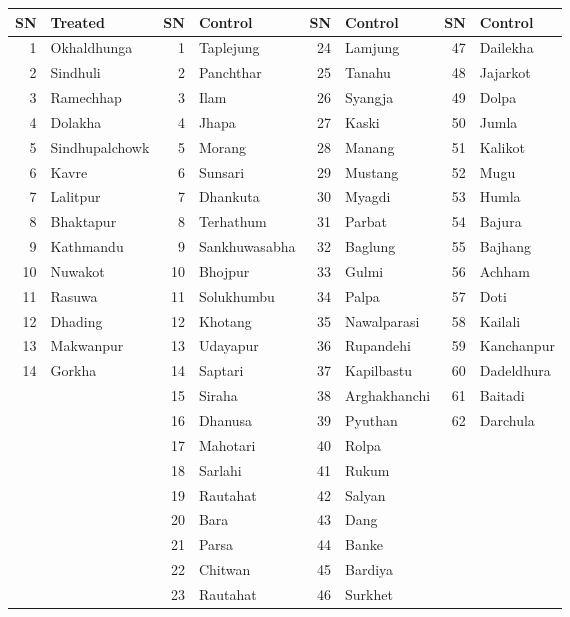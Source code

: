 


\begin{tabular}{r| l | r| l | r| l | r| l}
\hline\hline
SN& Treated & SN & Control  & SN & Control & SN & Control  \\
\hline
1  & Okhaldhunga     & 1  & Taplejung      & 24 & Lamjung         & 47 & Dailekha \\
2  & Sindhuli        & 2  & Panchthar      & 25 & Tanahu          & 48 & Jajarkot \\
3  & Ramechhap       & 3  & Ilam           & 26 & Syangja         & 49 & Dolpa \\
4  & Dolakha         & 4  & Jhapa          & 27 & Kaski           & 50 & Jumla \\
5  & Sindhupalchowk  & 5  & Morang         & 28 & Manang          & 51 & Kalikot \\
6  & Kavre           & 6  & Sunsari        & 29 & Mustang         & 52 & Mugu \\
7  & Lalitpur        & 7  & Dhankuta       & 30 & Myagdi          & 53 & Humla \\
8  & Bhaktapur       & 8  & Terhathum      & 31 & Parbat          & 54 & Bajura \\
9  & Kathmandu       & 9  & Sankhuwasabha  & 32 & Baglung         & 55 & Bajhang \\
10 & Nuwakot         & 10 & Bhojpur        & 33 & Gulmi           & 56 & Achham \\
11 & Rasuwa          & 11 & Solukhumbu     & 34 & Palpa           & 57 & Doti \\
12 & Dhading         & 12 & Khotang        & 35 & Nawalparasi     & 58 & Kailali \\
13 & Makwanpur       & 13 & Udayapur       & 36 & Rupandehi       & 59 & Kanchanpur \\
14 & Gorkha          & 14 & Saptari        & 37 & Kapilbastu      & 60 & Dadeldhura \\
    &                & 15 & Siraha         & 38 & Arghakhanchi    & 61 & Baitadi \\
    &                & 16 & Dhanusa        & 39 & Pyuthan         & 62 & Darchula \\
    &                & 17 & Mahotari       & 40 & Rolpa           &    &         \\
    &                & 18 & Sarlahi        & 41 & Rukum           &    &         \\
    &                & 19 & Rautahat       & 42 & Salyan          &    &         \\
    &                & 20 & Bara           & 43 & Dang            &    &         \\
    &                & 21 & Parsa          & 44 & Banke           &    &         \\
    &                & 22 & Chitwan        & 45 & Bardiya         &    &         \\
    &                & 23 & Rautahat       & 46 & Surkhet         &    &         \\
\hline\hline
\end{tabular}

